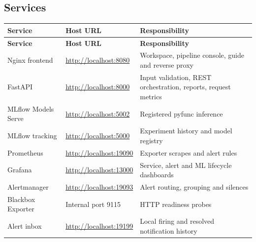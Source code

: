 \documentclass[11pt,a4paper]{article}
\begin{document}
\subsection*{Services}
\begingroup\small
\begin{longtable}{@{}>{\raggedright\arraybackslash}p{0.3333\dimexpr\textwidth-24pt\relax}>{\raggedright\arraybackslash}p{0.3333\dimexpr\textwidth-24pt\relax}>{\raggedright\arraybackslash}p{0.3333\dimexpr\textwidth-24pt\relax}@{}}
\toprule
\textbf{Service} & \textbf{Host URL} & \textbf{Responsibility} \\
\midrule
\endfirsthead
\textbf{Service} & \textbf{Host URL} & \textbf{Responsibility} \\
\midrule
\endhead
Nginx frontend & \url{http://localhost:8080} & Workspace, pipeline console, guide and reverse proxy \\
FastAPI & \url{http://localhost:8000} & Input validation, REST orchestration, reports, request metrics \\
MLflow Models Serve & \url{http://localhost:5002} & Registered pyfunc inference \\
MLflow tracking & \url{http://localhost:5000} & Experiment history and model registry \\
Prometheus & \url{http://localhost:19090} & Exporter scrapes and alert rules \\
Grafana & \url{http://localhost:13000} & Service, alert and ML lifecycle dashboards \\
Alertmanager & \url{http://localhost:19093} & Alert routing, grouping and silences \\
Blackbox Exporter & Internal port 9115 & HTTP readiness probes \\
Alert inbox & \url{http://localhost:19199} & Local firing and resolved notification history \\
\bottomrule
\end{longtable}
\endgroup
\end{document}
